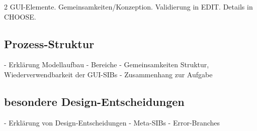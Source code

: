 2 GUI-Elemente. Gemeinsamkeiten/Konzeption. Validierung in EDIT. Details in CHOOSE.

\subsection{Prozess-Struktur}
- Erklärung Modellaufbau 
	- Bereiche
	- Gemeinsamkeiten Struktur, Wiederverwendbarkeit der GUI-SIBs
	- Zusammenhang zur Aufgabe
	
	
\subsection{besondere Design-Entscheidungen}	
- Erklärung von Design-Entscheidungen
	- Meta-SIBs
	- Error-Branches